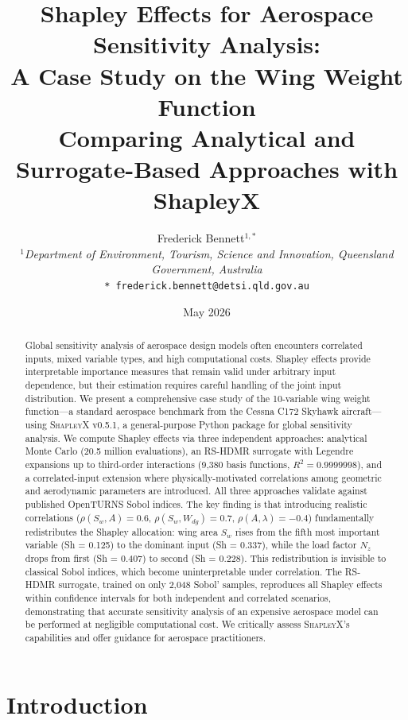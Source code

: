 \documentclass[11pt,a4paper]{article}
\title{\bfseries Shapley Effects for Aerospace Sensitivity Analysis:\\A Case Study on the Wing Weight Function\\Comparing Analytical and Surrogate-Based Approaches with ShapleyX}
\author{Frederick Bennett$^{1,*}$\\[3pt]
\textit{$^{1}$Department of Environment, Tourism, Science and Innovation, Queensland Government, Australia}\\[3pt]
\texttt{* frederick.bennett@detsi.qld.gov.au}}
\date{May 2026}
\begin{document}
\maketitle

\begin{abstract}
Global sensitivity analysis of aerospace design models often encounters correlated inputs, mixed variable types, and high computational costs. Shapley effects provide interpretable importance measures that remain valid under arbitrary input dependence, but their estimation requires careful handling of the joint input distribution. We present a comprehensive case study of the 10-variable wing weight function---a standard aerospace benchmark from the Cessna C172 Skyhawk aircraft---using \textsc{ShapleyX} v0.5.1, a general-purpose Python package for global sensitivity analysis. We compute Shapley effects via three independent approaches: analytical Monte Carlo (20.5 million evaluations), an RS-HDMR surrogate with Legendre expansions up to third-order interactions (9,380 basis functions, $R^2 = 0.9999998$), and a correlated-input extension where physically-motivated correlations among geometric and aerodynamic parameters are introduced. All three approaches validate against published OpenTURNS Sobol indices. The key finding is that introducing realistic correlations ($\rho(S_w, A) = 0.6$, $\rho(S_w, W_{dg}) = 0.7$, $\rho(A, \lambda) = -0.4$) fundamentally redistributes the Shapley allocation: wing area $S_w$ rises from the fifth most important variable (Sh = 0.125) to the dominant input (Sh = 0.337), while the load factor $N_z$ drops from first (Sh = 0.407) to second (Sh = 0.228). This redistribution is invisible to classical Sobol indices, which become uninterpretable under correlation. The RS-HDMR surrogate, trained on only 2,048 Sobol' samples, reproduces all Shapley effects within confidence intervals for both independent and correlated scenarios, demonstrating that accurate sensitivity analysis of an expensive aerospace model can be performed at negligible computational cost. We critically assess \textsc{ShapleyX}'s capabilities and offer guidance for aerospace practitioners.
\end{abstract}

\section{Introduction}
\end{document}
